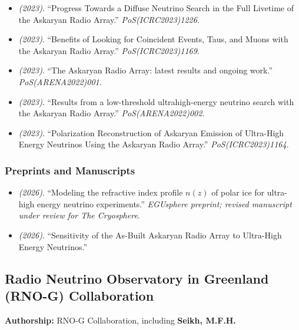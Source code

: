 \begin{itemize}
\item \textit{(2023)}. ``Progress Towards a Diffuse Neutrino Search in the Full Livetime of the Askaryan Radio Array.'' \textit{PoS(ICRC2023)1226}.  
\item \textit{(2023)}. ``Benefits of Looking for Coincident Events, Taus, and Muons with the Askaryan Radio Array.'' \textit{PoS(ICRC2023)1169}.  
\item \textit{(2023)}. ``The Askaryan Radio Array: latest results and ongoing work.'' \textit{PoS(ARENA2022)001}. 
\item \textit{(2023)}. ``Results from a low-threshold ultrahigh-energy neutrino search with the Askaryan Radio Array.'' \textit{PoS(ARENA2022)002}. 
\item \textit{(2023)}. ``Polarization Reconstruction of Askaryan Emission of Ultra-High Energy Neutrinos Using the Askaryan Radio Array.'' \textit{PoS(ICRC2023)1164}. 
\end{itemize}
\subsubsection{Preprints and Manuscripts}
\begin{itemize}
\item \textit{(2026)}. ``Modeling the refractive index profile $n(z)$ of polar ice for ultra-high energy neutrino experiments.'' \textit{EGUsphere preprint; revised manuscript under review for The Cryosphere}.  
\item \textit{(2026)}. ``Sensitivity of the As-Built Askaryan Radio Array to Ultra-High Energy Neutrinos.'' 
\end{itemize}
\medskip

\subsection{Radio Neutrino Observatory in Greenland (RNO-G) Collaboration}
\textbf{Authorship:} RNO-G Collaboration, including \textbf{Seikh, M.F.H.}
